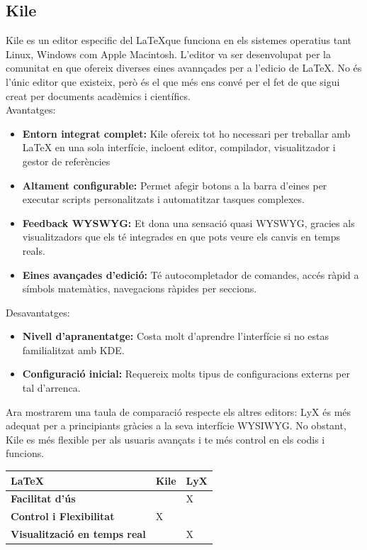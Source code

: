 \subsection{Kile}
Kile es un editor especific del \LaTeX que funciona en els sistemes operatius tant Linux, Windows com Apple Macintosh. L'editor va ser desenvolupat per la comunitat   en que ofereix diverses eines avannçades per a l'edicio de LaTeX. No és l'únic editor que existeix, però és el que més ens convé per el fet de que sigui creat per documents acadèmics i científics.\\

Avantatges:
\begin{itemize}
\item \textbf{Entorn integrat complet:} Kile ofereix tot ho necessari per treballar amb LaTeX en una sola interfície, incloent editor, compilador, visualitzador i gestor de referències
\item \textbf{Altament configurable: } Permet afegir botons a la barra d'eines per executar scripts personalitzats i automatitzar tasques complexes.
\item \textbf{Feedback WYSWYG:} Et dona una sensació quasi WYSWYG, gracies als visualitzadors que els té integrades en que pots veure els canvis en temps reals.
\item \textbf{Eines avançades d'edició:} Té autocompletador de comandes, accés ràpid a símbols matemàtics, navegacions ràpides per seccions.
\end{itemize}
Desavantatges:
\begin{itemize}
\item \textbf{Nivell d'apranentatge:} Costa molt d'aprendre l'interfície si no estas familialitzat amb KDE.
\item \textbf{Configuració inicial:} Requereix molts tipus de configuracions externs per tal d'arrenca.
\end{itemize}

Ara mostrarem una taula de comparació respecte els altres editors:
LyX és més adequat per a principiants gràcies a la seva interfície WYSIWYG. No obstant, Kile es més flexible per als usuaris avançats i te més control en els codis i funcions. \\
\begin{table}[h!]
 \begin{tabular}{|l|l|l|}
\hline
 \LaTeX & \textbf{Kile} & \textbf{LyX} \\ \hline
 \textbf{Facilitat d'ús} &  & X \\ \hline
 \textbf{Control i Flexibilitat} & X & \\ \hline
 \textbf{Visualització en temps real} & & X \\ \hline
\end{tabular}
\end{table}

